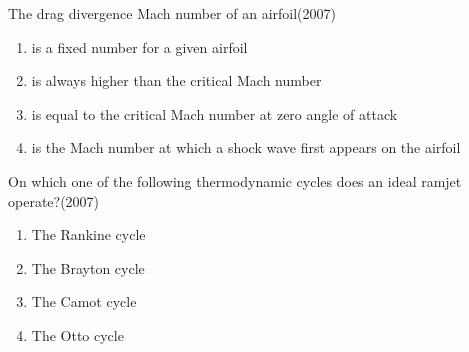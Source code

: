 \item The drag divergence Mach number of an airfoil\hfill(2007)
\begin{enumerate}
\item is a fixed number for a given airfoil
\item is always higher than the critical Mach number
\item is equal to the critical Mach number at zero angle of attack
\item is the Mach number at which a shock wave first appears on the airfoil
\end{enumerate}


\item On which one of the following thermodynamic cycles does an ideal ramjet operate?\hfill(2007)
\begin{multicols}{2}
\begin{enumerate}
\item The Rankine cycle
\item The Brayton cycle
\item The Camot cycle
\item The Otto cycle
\end{enumerate}
\end{multicols}
